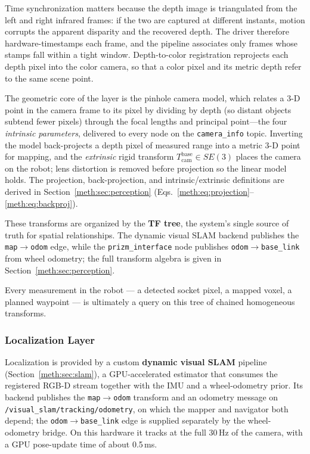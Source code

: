 Time synchronization matters because the depth image is triangulated from the left and right infrared frames: if the two are captured at different instants, motion corrupts the apparent disparity and the recovered depth. The driver therefore hardware-timestamps each frame, and the pipeline associates only frames whose stamps fall within a tight window. Depth-to-color registration reprojects each depth pixel into the color camera, so that a color pixel and its metric depth refer to the same scene point.

The geometric core of the layer is the pinhole camera model, which relates a 3-D point in the camera frame to its pixel by dividing by depth (so distant objects subtend fewer pixels) through the focal lengths and principal point---the four \emph{intrinsic parameters}, delivered to every node on the \texttt{camera\_info} topic. Inverting the model back-projects a depth pixel of measured range into a metric 3-D point for mapping, and the \emph{extrinsic} rigid transform $T_{\text{cam}}^{\text{base}}\in SE(3)$ places the camera on the robot; lens distortion is removed before projection so the linear model holds. The projection, back-projection, and intrinsic/extrinsic definitions are derived in Section~\ref{meth:sec:perception} (Eqs.~\eqref{meth:eq:projection}--\eqref{meth:eq:backproj}).

These transforms are organized by the \textbf{TF tree}, the system's single source of truth for spatial relationships. The dynamic visual SLAM backend publishes the \texttt{map}$\to$\texttt{odom} edge, while the \texttt{prizm\_interface} node publishes \texttt{odom}$\to$\texttt{base\_link} from wheel odometry; the full transform algebra is given in Section~\ref{meth:sec:perception}.

Every measurement in the robot --- a detected socket pixel, a mapped voxel, a planned waypoint --- is ultimately a query on this tree of chained homogeneous transforms.

\subsubsection{Localization Layer}\label{sec:localization}

Localization is provided by a custom \textbf{dynamic visual SLAM} pipeline (Section~\ref{meth:sec:slam}), a GPU-accelerated estimator that consumes the registered RGB-D stream together with the IMU and a wheel-odometry prior. Its backend publishes the \texttt{map}$\to$\texttt{odom} transform and an odometry message on \texttt{/visual\_slam/tracking/odometry}, on which the mapper and navigator both depend; the \texttt{odom}$\to$\texttt{base\_link} edge is supplied separately by the wheel-odometry bridge. On this hardware it tracks at the full 30\,Hz of the camera, with a GPU pose-update time of about 0.5\,ms.

